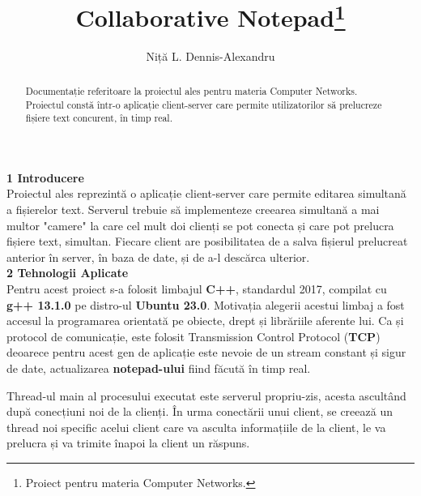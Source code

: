 \documentclass[runningheads]{llncs}
\begin{document}
\title{Collaborative Notepad\thanks{Proiect pentru materia Computer Networks.}}
\author{Niță L. Dennis-Alexandru}

%
%

\maketitle



\begin{abstract}
    Documentație referitoare la proiectul ales pentru materia Computer Networks. Proiectul constă într-o aplicație
    client-server care permite utilizatorilor să prelucreze fișiere text concurent, în timp real.
    
    \end{abstract}

{\Large \bf 1 Introducere} 
\\

Proiectul ales reprezintă o aplicație client-server care permite editarea simultană a fișierelor text.
Serverul trebuie să implementeze creearea simultană a mai multor "camere" la care cel mult doi clienți se pot conecta și care pot prelucra fișiere text, simultan.
Fiecare client are posibilitatea de a salva fișierul prelucreat anterior în server, în baza de date, și de a-l descărca ulterior.
\\

{\Large \bf 2 Tehnologii Aplicate} 
\\


Pentru acest proiect s-a folosit limbajul {\bf C++}, standardul 2017, compilat cu {\bf g++ 13.1.0} pe distro-ul {\bf Ubuntu 23.0}. Motivația alegerii acestui limbaj a fost
accesul la programarea orientată pe obiecte, drept și librăriile aferente lui. Ca și protocol de comunicație, este folosit Transmission Control Protocol ({\bf TCP}) deoarece
pentru acest gen de aplicație este nevoie de un stream constant și sigur de date, actualizarea {\bf notepad-ului} fiind făcută în timp real.

Thread-ul main al procesului executat este serverul propriu-zis, acesta ascultând după conecțiuni noi de la clienți. În urma conectării unui client,
se creează un thread noi specific acelui client care va asculta informațiile de la client, le va prelucra și va trimite înapoi la client un răspuns. 
\end{document}
